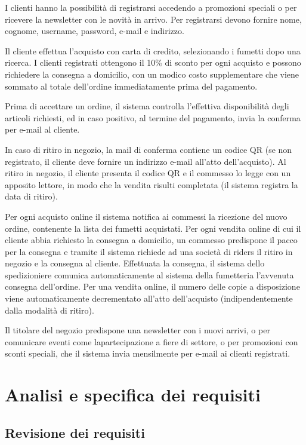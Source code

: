 \documentclass[12pt, a4paper]{article}
\begin{document}
I clienti hanno la possibilità di registrarsi accedendo a promozioni speciali o per ricevere la newsletter con le novità in arrivo. Per registrarsi devono fornire nome, cognome, username, password, e-mail e indirizzo.

Il cliente effettua l’acquisto con carta di credito, selezionando i fumetti dopo una ricerca. I clienti registrati ottengono il 10\% di sconto per ogni acquisto e possono richiedere la consegna a domicilio, con un modico costo supplementare che viene sommato al totale dell’ordine immediatamente prima del pagamento.

Prima di accettare un ordine, il sistema controlla l’effettiva disponibilità degli articoli richiesti, ed in caso positivo, al termine del pagamento, invia la conferma per e-mail al cliente.

In caso di ritiro in negozio, la mail di conferma contiene un codice QR (se non registrato, il cliente deve fornire un indirizzo e-mail all’atto dell’acquisto). Al ritiro in negozio, il cliente presenta il codice QR e il commesso lo legge con un apposito lettore, in modo che la vendita risulti completata (il sistema registra la data di ritiro).

Per ogni acquisto online il sistema notifica ai commessi la ricezione del nuovo ordine, contenente la lista dei fumetti acquistati. Per ogni vendita online di cui il cliente abbia richiesto la consegna a domicilio, un commesso predispone il pacco per la consegna e tramite il sistema richiede ad una società di riders il ritiro in negozio e la consegna al cliente. Effettuata la consegna, il sistema dello spedizioniere comunica automaticamente al sistema della fumetteria l’avvenuta consegna dell’ordine. Per una vendita online, il numero delle copie a disposizione viene automaticamente decrementato all’atto dell’acquisto (indipendentemente dalla modalità di ritiro).

Il titolare del negozio predispone una newsletter con i nuovi arrivi, o per comunicare eventi come lapartecipazione a fiere di settore, o per promozioni con sconti speciali, che il sistema invia mensilmente per e-mail ai clienti registrati.

\newpage

\section{Analisi e specifica dei requisiti}
\subsection{Revisione dei requisiti}
\end{document}
